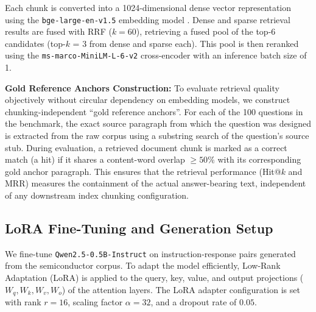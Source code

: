 \documentclass[a4paper,fleqn]{cas-sc}
\begin{document}
Each chunk is converted into a 1024-dimensional dense vector representation using the \texttt{bge-large-en-v1.5} embedding model \citep{BGE-Xiao}. Dense and sparse retrieval results are fused with RRF ($k = 60$), retrieving a fused pool of the top-6 candidates (top-$k$ = 3 from dense and sparse each). This pool is then reranked using the \texttt{ms-marco-MiniLM-L-6-v2} cross-encoder with an inference batch size of 1.

\noindent \textbf{Gold Reference Anchors Construction:} To evaluate retrieval quality objectively without circular dependency on embedding models, we construct chunking-independent ``gold reference anchors''. For each of the 100 questions in the benchmark, the exact source paragraph from which the question was designed is extracted from the raw corpus using a substring search of the question's source stub. During evaluation, a retrieved document chunk is marked as a correct match (a hit) if it shares a content-word overlap $\ge 50\%$ with its corresponding gold anchor paragraph. This ensures that the retrieval performance (Hit@$k$ and MRR) measures the containment of the actual answer-bearing text, independent of any downstream index chunking configuration.

\subsection{LoRA Fine-Tuning and Generation Setup}
We fine-tune \texttt{Qwen2.5-0.5B-Instruct} on instruction-response pairs generated from
the semiconductor corpus. To adapt the model efficiently, Low-Rank Adaptation (LoRA)
\citep{LoRA-Hu} is applied to the query, key, value, and output projections
($W_q, W_k, W_v, W_o$) of the attention layers. The LoRA adapter configuration is set
with rank $r = 16$, scaling factor $\alpha = 32$, and a dropout rate of $0.05$.
\end{document}
